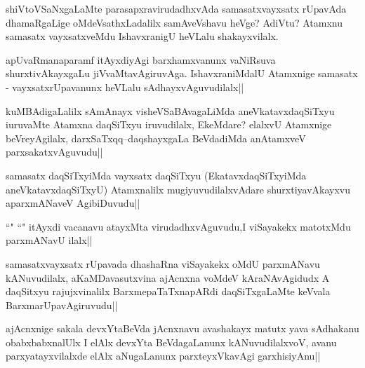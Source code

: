 \begin{artha}
shiVtoVSaNxgaLaMte parasapxravirudadhxvAda samasatxvayxsatx rUpavAda dhamaRgaLige oMdeVsathxLadalilx samAveVshavu heVge? AdiVtu? Atamxnu samasatx vayxsatxveMdu IshavxranigU heVLalu shakayxvilalx.
\end{artha}

\begin{artha}
apUvaRmanaparamf itAyxdiyAgi barxhamxvanunx vaNiRsuva shurxtivAkayxgaLu jiVvaMtavAgiruvAga. IshavxraniMdalU Atamxnige samasatx - vayxsatxrUpavanunx heVLalu sAdhayxvAguvudilalx||
\end{artha}


\begin{artha}
kuMBAdigaLalilx sAmAnayx visheVSaBAvagaLiMda aneVkatavxdaqSiTxyu iuruvaMte Atamxna daqSiTxyu iruvudilalx, EkeMdare? elalxvU Atamxnige beVreyAgilalx, darxSaTxqq--daqshayxgaLa BeVdadiMda anAtamxveV parxsakatxvAguvudu||
\end{artha}


\begin{artha}
samasatx daqSiTxyiMda vayxsatx daqSiTxyu (EkatavxdaqSiTxyiMda aneVkatavxdaqSiTxyU) Atamxnalilx mugiyuvudilalxvAdare shurxtiyavAkayxvu aparxmANaveV AgibiDuvudu||
\end{artha}

\begin{artha}
``\stext" ``\stext" itAyxdi vacanavu atayxMta virudadhxvAguvudu,I viSayakekx matotxMdu 
parxmANavU ilalx||
\end{artha}


\begin{artha}
samasatxvayxsatx rUpavada dhashaRna viSayakekx oMdU parxmANavu kANuvudilalx, aKaMDavasutxvina ajAcnxna voMdeV kAraNAvAgidudx A daqSitxyu rajujxvinalilx BarxmepaTaTxnapARdi daqSiTxgaLaMte keVvala BarxmarUpavAgiruvudu||
\end{artha}


\begin{artha}
ajAcnxnige sakala devxYtaBeVda jAcnxnavu avashakayx matutx yava sAdhakanu obabxbabxnalUlx I elAlx devxYta BeVdagaLanunx kANuvudilalxvoV, avanu parxyatayxvilalxde elAlx aNugaLanunx parxteyxVkavAgi garxhisiyAnu||
\end{artha}

